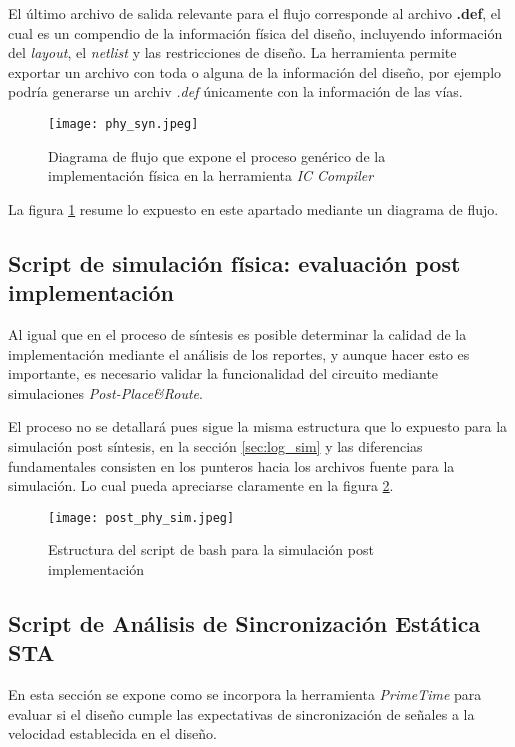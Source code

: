 El último archivo de salida relevante para el flujo corresponde al archivo \textbf{.def}, el cual es un compendio de la información física del diseño, incluyendo información del \textit{layout}, el \textit{netlist} y las restricciones de diseño. La herramienta permite exportar un archivo con toda o alguna de la información del diseño, por ejemplo podría generarse un archiv \textit{.def} únicamente con la información de las vías.

\begin{figure}[ht]
\texttt{[image: phy\_syn.jpeg]}
\centering
\caption{Diagrama de flujo que expone el proceso genérico de la implementación física en la herramienta \textit{IC Compiler}}
\label{fig:phy_script}
\end{figure}

La figura \ref{fig:phy_script} resume lo expuesto en este apartado mediante un diagrama de flujo.

\subsection{Script de simulación física: evaluación post implementación}

Al igual que en el proceso de síntesis es posible determinar la calidad de la implementación mediante el análisis de los reportes, y aunque hacer esto es importante, es necesario validar la funcionalidad del circuito mediante simulaciones \textit{Post-Place\&Route}.

El proceso no se detallará pues sigue la misma estructura que lo expuesto para la simulación post síntesis, en la sección \ref{sec:log_sim} y las diferencias fundamentales consisten en los punteros hacia los archivos fuente para la simulación. Lo cual pueda apreciarse claramente en la figura \ref{fig:phy_sim}.

\begin{figure}[ht]
\texttt{[image: post\_phy\_sim.jpeg]}
\centering
\caption{Estructura del script de bash para la simulación post implementación}
\label{fig:phy_sim}
\end{figure}

\subsection{Script de Análisis de Sincronización Estática STA}
\label{sec:STA}

En esta sección se expone como se incorpora la herramienta \textit{PrimeTime} para evaluar si el diseño cumple las expectativas de sincronización de señales a la velocidad establecida en el diseño.

